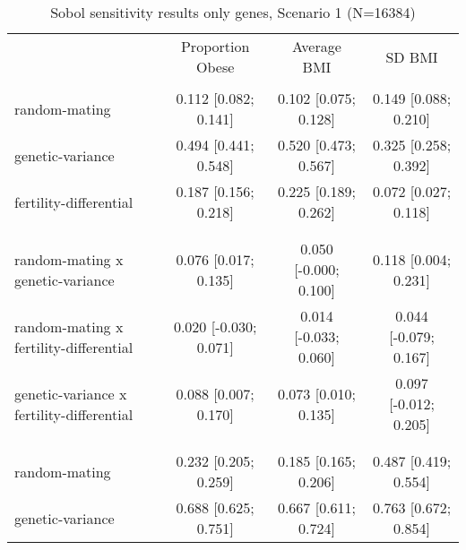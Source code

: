 
    \begin{table}[htp]
    \renewcommand{\arraystretch}{1.3}
    \setlength{\tabcolsep}{5pt}
    \caption{Sobol sensitivity results only genes, Scenario 1 (N=16384)}
    \label{tab:sobol-snp}
    \footnotesize
    \centering
    \begin{threeparttable}
    \begin{tabular}{lccc}
    \hline
    \addlinespace
    & Proportion Obese & Average BMI & SD BMI \\
    \addlinespace
    \hline
    \addlinespace[6pt]
    \multicolumn{4}{l}{\hspace{1em} S1} \\
\hspace{1.5em} random-mating & 0.112 [0.082; 0.141]   & 0.102 [0.075; 0.128]   & 0.149 [0.088; 0.210] \\
	  \hspace{1.5em} genetic-variance & 0.494 [0.441; 0.548]   & 0.520 [0.473; 0.567]   & 0.325 [0.258; 0.392] \\
	  \hspace{1.5em} fertility-differential & 0.187 [0.156; 0.218]   & 0.225 [0.189; 0.262]   & 0.072 [0.027; 0.118] \\
	 \\
    \addlinespace[12pt]
    \multicolumn{4}{l}{\hspace{1em} S2} \\ 
\hspace{1.5em} random-mating x genetic-variance & 0.076 [0.017; 0.135]   & 0.050 [-0.000; 0.100]   & 0.118 [0.004; 0.231] \\
	  \hspace{1.5em} random-mating x fertility-differential & 0.020 [-0.030; 0.071]   & 0.014 [-0.033; 0.060]   & 0.044 [-0.079; 0.167] \\
	  \hspace{1.5em} genetic-variance x fertility-differential & 0.088 [0.007; 0.170]   & 0.073 [0.010; 0.135]   & 0.097 [-0.012; 0.205] \\
	 \\
    \addlinespace[12pt]
    \multicolumn{4}{l}{\hspace{1em} ST} \\ 
\hspace{1.5em} random-mating & 0.232 [0.205; 0.259]   & 0.185 [0.165; 0.206]   & 0.487 [0.419; 0.554] \\
	  \hspace{1.5em} genetic-variance & 0.688 [0.625; 0.751]   & 0.667 [0.611; 0.724]   & 0.763 [0.672; 0.854] \\

\end{tabular}
\end{threeparttable}
\end{table}
